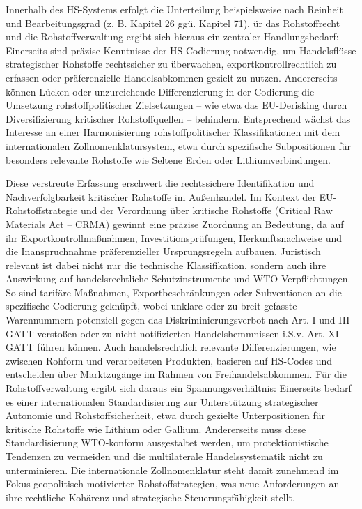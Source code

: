 \documentclass[12pt,a4paper,oneside]{book} %
\begin{document}
Innerhalb des HS-Systems erfolgt die Unterteilung beispielsweise nach Reinheit und Bearbeitungsgrad (z. B. Kapitel 26 ggü. Kapitel 71). ür das Rohstoffrecht und die Rohstoffverwaltung ergibt sich hieraus ein zentraler Handlungsbedarf: Einerseits sind präzise Kenntnisse der HS-Codierung notwendig, um Handelsflüsse strategischer Rohstoffe rechtssicher zu überwachen, exportkontrollrechtlich zu erfassen oder präferenzielle Handelsabkommen gezielt zu nutzen. Andererseits können Lücken oder unzureichende Differenzierung in der Codierung die Umsetzung rohstoffpolitischer Zielsetzungen – wie etwa das EU-Derisking durch Diversifizierung kritischer Rohstoffquellen – behindern. Entsprechend wächst das Interesse an einer Harmonisierung rohstoffpolitischer Klassifikationen mit dem internationalen Zollnomenklatursystem, etwa durch spezifische Subpositionen für besonders relevante Rohstoffe wie Seltene Erden oder Lithiumverbindungen.

Diese verstreute Erfassung erschwert die rechtssichere Identifikation und Nachverfolgbarkeit kritischer Rohstoffe im Außenhandel. Im Kontext der EU-Rohstoffstrategie und der Verordnung über kritische Rohstoffe (Critical Raw Materials Act – CRMA) gewinnt eine präzise Zuordnung an Bedeutung, da auf ihr Exportkontrollmaßnahmen, Investitionsprüfungen, Herkunftsnachweise und die Inanspruchnahme präferenzieller Ursprungsregeln aufbauen. Juristisch relevant ist dabei nicht nur die technische Klassifikation, sondern auch ihre Auswirkung auf handelsrechtliche Schutzinstrumente und WTO-Verpflichtungen. So sind tarifäre Maßnahmen, Exportbeschränkungen oder Subventionen an die spezifische Codierung geknüpft, wobei unklare oder zu breit gefasste Warennummern potenziell gegen das Diskriminierungsverbot nach Art. I und III GATT verstoßen oder zu nicht-notifizierten Handelshemmnissen i.S.v. Art. XI GATT führen können. Auch handelsrechtlich relevante Differenzierungen, wie zwischen Rohform und verarbeiteten Produkten, basieren auf HS-Codes und entscheiden über Marktzugänge im Rahmen von Freihandelsabkommen. Für die Rohstoffverwaltung ergibt sich daraus ein Spannungsverhältnis: Einerseits bedarf es einer internationalen Standardisierung zur Unterstützung strategischer Autonomie und Rohstoffsicherheit, etwa durch gezielte Unterpositionen für kritische Rohstoffe wie Lithium oder Gallium. Andererseits muss diese Standardisierung WTO-konform ausgestaltet werden, um protektionistische Tendenzen zu vermeiden und die multilaterale Handelssystematik nicht zu unterminieren. Die internationale Zollnomenklatur steht damit zunehmend im Fokus geopolitisch motivierter Rohstoffstrategien, was neue Anforderungen an ihre rechtliche Kohärenz und strategische Steuerungsfähigkeit stellt.
\end{document}
